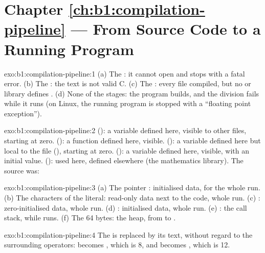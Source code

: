 \section*{Chapter \ref{ch:b1:compilation-pipeline} --- From Source Code to a Running Program}

\begin{solution}{exo:b1:compilation-pipeline:1}
(a) The : it cannot open  and stops with a fatal error. (b) The : the text is
not valid C. (c) The : every file compiled, but no  or library defines . (d) None of
the stages: the program builds, and the division fails while it runs (on Linux, the running program is stopped
with a ``floating point exception'').
\end{solution}

\begin{solution}{exo:b1:compilation-pipeline:2}
 (): a variable defined here, visible to other files, starting at zero. 
(): a function defined here, visible.  (): a variable defined here but local to
the file (), starting at zero.  (): a variable defined here, visible, with an
initial value.  (): used here, defined elsewhere (the mathematics library). The source was:
\end{solution}

\begin{solution}{exo:b1:compilation-pipeline:3}
(a) The pointer : initialised data, for the whole run. (b) The characters of the literal: read-only
data next to the code, whole run. (c) : zero-initialised data, whole run. (d) :
initialised data, whole run. (e) : the call stack, while  runs. (f) The 64 bytes: the
heap, from  to .
\end{solution}

\begin{solution}{exo:b1:compilation-pipeline:4}
The  is replaced by its text, without regard to the surrounding operators:  becomes
, which is 8, and  becomes , which is 12.
\end{solution}

